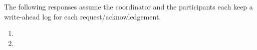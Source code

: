 The following responses assume the coordinator and the participants each keep a write-ahead log for each request/acknowledgement.
\begin{enumerate}[1]
\item
\item
\end{enumerate}
